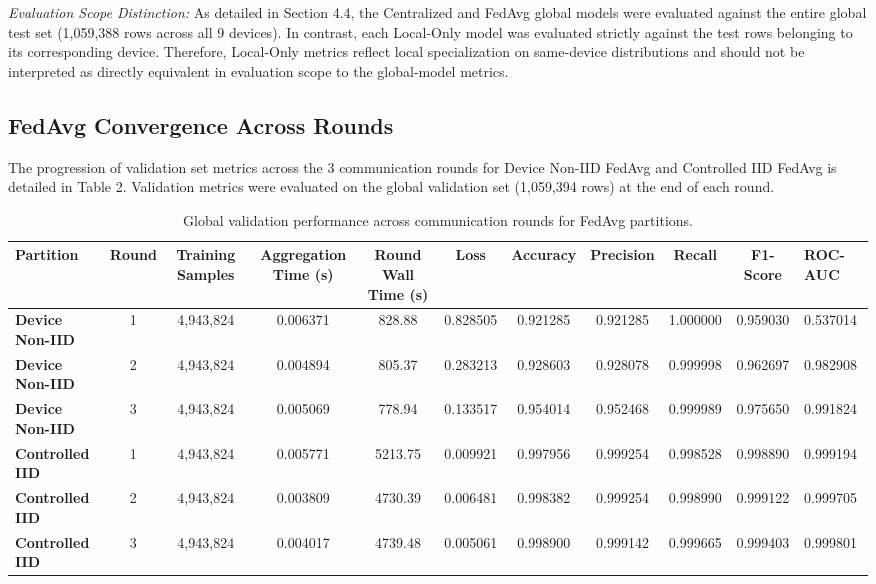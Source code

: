 \documentclass[11pt,a4paper]{article}
\begin{document}
\textit{Evaluation Scope Distinction:} As detailed in Section 4.4, the Centralized and FedAvg global models were evaluated against the entire global test set (1,059,388 rows across all 9 devices). In contrast, each Local-Only model was evaluated strictly against the test rows belonging to its corresponding device. Therefore, Local-Only metrics reflect local specialization on same-device distributions and should not be interpreted as directly equivalent in evaluation scope to the global-model metrics.

\subsection{FedAvg Convergence Across Rounds}
The progression of validation set metrics across the 3 communication rounds for Device Non-IID FedAvg and Controlled IID FedAvg is detailed in Table 2. Validation metrics were evaluated on the global validation set (1,059,394 rows) at the end of each round.

\begin{table}[htbp]
\centering
\caption{Global validation performance across communication rounds for FedAvg partitions.}
\begin{adjustbox}{width=\textwidth,center}
\begin{tabular}{l c c c c c c c c c}
\toprule
\textbf{Partition} & \textbf{Round} & \textbf{Training Samples} & \textbf{Aggregation Time (s)} & \textbf{Round Wall Time (s)} & \textbf{Loss} & \textbf{Accuracy} & \textbf{Precision} & \textbf{Recall} & \textbf{F1-Score} & \textbf{ROC-AUC} \\
\midrule
\textbf{Device Non-IID} & 1 & 4,943,824 & 0.006371 & 828.88 & 0.828505 & 0.921285 & 0.921285 & 1.000000 & 0.959030 & 0.537014 \\
\textbf{Device Non-IID} & 2 & 4,943,824 & 0.004894 & 805.37 & 0.283213 & 0.928603 & 0.928078 & 0.999998 & 0.962697 & 0.982908 \\
\textbf{Device Non-IID} & 3 & 4,943,824 & 0.005069 & 778.94 & 0.133517 & 0.954014 & 0.952468 & 0.999989 & 0.975650 & 0.991824 \\
\textbf{Controlled IID} & 1 & 4,943,824 & 0.005771 & 5213.75 & 0.009921 & 0.997956 & 0.999254 & 0.998528 & 0.998890 & 0.999194 \\
\textbf{Controlled IID} & 2 & 4,943,824 & 0.003809 & 4730.39 & 0.006481 & 0.998382 & 0.999254 & 0.998990 & 0.999122 & 0.999705 \\
\textbf{Controlled IID} & 3 & 4,943,824 & 0.004017 & 4739.48 & 0.005061 & 0.998900 & 0.999142 & 0.999665 & 0.999403 & 0.999801 \\
\bottomrule
\end{tabular}
\end{adjustbox}
\end{table}
\end{document}
